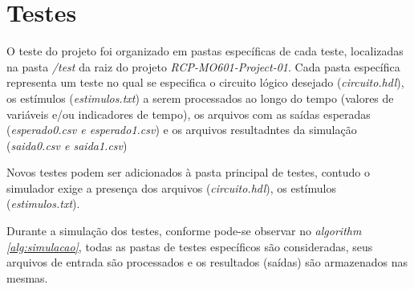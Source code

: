 
\section{Testes}

O teste do projeto foi organizado em pastas específicas de cada teste, localizadas na pasta \textit{/test} da raiz 
do projeto \textit{RCP-MO601-Project-01}. Cada pasta específica representa um teste no qual se especifica o circuito 
lógico desejado (\textit{circuito.hdl}), os estímulos (\textit{estimulos.txt}) a serem processados ao longo do tempo (valores de variáveis e/ou indicadores de tempo), 
os arquivos com as saídas esperadas (\textit{esperado0.csv e esperado1.csv}) e os arquivos resultadntes da simulação 
(\textit{saida0.csv e saida1.csv})

Novos testes podem ser adicionados à pasta principal de testes, contudo o simulador exige a
presença dos arquivos (\textit{circuito.hdl}), os estímulos (\textit{estimulos.txt}).

Durante a simulação dos testes, conforme pode-se observar no \textit{algorithm \space \ref{alg:simulacao}}, 
todas as pastas de testes específicos são consideradas, seus arquivos de entrada são 
processados e os resultados (saídas) são armazenados nas mesmas.




